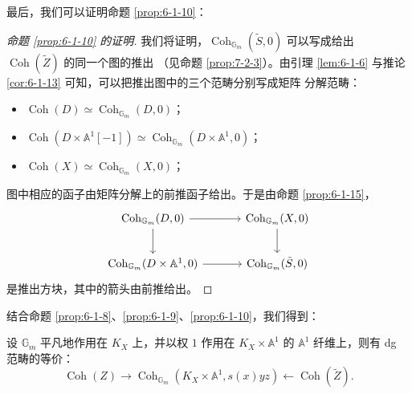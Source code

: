 最后，我们可以证明命题 \ref{prop:6-1-10}：

\begin{proof}[命题 \ref{prop:6-1-10} 的证明]
我们将证明，$\operatorname{Coh}_{\mathbb G_m}(\tilde S,0)$ 可以写成给出 $\operatorname{Coh}(\tilde Z)$ 的同一个图的推出
（见命题 \ref{prop:7-2-3}）。由引理 \ref{lem:6-1-6} 与推论 \ref{cor:6-1-13} 可知，可以把推出图中的三个范畴分别写成矩阵
分解范畴：
\begin{itemize}
\item $\operatorname{Coh}(D)\simeq\operatorname{Coh}_{\mathbb G_m}(D,0)$；
\item $\operatorname{Coh}(D\times\mathbb A^1[-1])\simeq\operatorname{Coh}_{\mathbb G_m}(D\times\mathbb A^1,0)$；
\item $\operatorname{Coh}(X)\simeq\operatorname{Coh}_{\mathbb G_m}(X,0)$；
\end{itemize}
图中相应的函子由矩阵分解上的前推函子给出。于是由命题 \ref{prop:6-1-15}，
\[
\begin{tikzcd}[column sep=3.4em, row sep=2.2em]
\operatorname{Coh}_{\mathbb G_m}(D,0) \arrow[r] \arrow[d] & \operatorname{Coh}_{\mathbb G_m}(X,0) \arrow[d] \\
\operatorname{Coh}_{\mathbb G_m}(D\times\mathbb A^1,0) \arrow[r] & \operatorname{Coh}_{\mathbb G_m}(\tilde S,0)
\end{tikzcd}
\]
是推出方块，其中的箭头由前推给出。
\end{proof}


结合命题 \ref{prop:6-1-8}、\ref{prop:6-1-9}、\ref{prop:6-1-10}，我们得到：

\begin{theorem}\label{thm:6-1-16}
设 $\mathbb G_m$ 平凡地作用在 $K_X$ 上，并以权 $1$ 作用在 $K_X\times\mathbb A^1$ 的 $\mathbb A^1$
纤维上，则有 dg 范畴的等价：
\[
\operatorname{Coh}(Z)\longrightarrow\operatorname{Coh}_{\mathbb G_m}(K_X\times\mathbb A^1,s(x)yz)
\longleftarrow\operatorname{Coh}(\tilde Z).
\]
\end{theorem}


